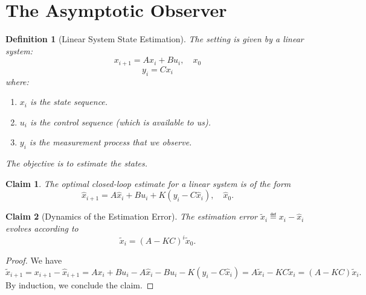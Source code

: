 \documentclass[a4 paper]{article}
\numberwithin{equation}{section}
\theoremstyle{boldStyle}
\theoremstyle{boldBlueStyle}
\newtheorem{claim}{Claim}[section]
\theoremstyle{boldPurpleStyle}
\theoremstyle{boldRedStyle}
\newtheorem{definition}{Definition}[section]
\theoremstyle{boldGreenStyle}
\begin{document}
\section{The Asymptotic Observer}

\begin{definition}[Linear System State Estimation]
  The setting is given by a linear system:
  \[
  x_{i+1} = A x_i + B u_i, \quad x_0
  \]
  \[
  y_i = C x_i
  \]
  where:
  \begin{enumerate}
      \item \( x_i \) is the state sequence.
      \item \( u_i \) is the control sequence (which is available to us).
      \item \( y_i \) is the measurement process that we observe.
  \end{enumerate}
  
  The objective is to estimate the states. 
\end{definition}

\begin{claim}
  The optimal closed-loop estimate for a linear system is of the form 
  \[
    \hat{x}_{i+1} = A \hat{x}_i + B u_i + K(y_i - C \hat{x}_i), \quad \hat{x}_0.
  \] 
\end{claim}

\begin{claim}[Dynamics of the Estimation Error]
  The estimation error \( \tilde{x}_{i} \eqdef x_{i} - \hat{x}_{i} \) evolves according to
  \[
  \tilde{x}_{i} = (A - KC)^{i} \tilde{x}_0.
  \]
\end{claim}

\begin{proof}
  We have
  \[
  \tilde{x}_{i+1} = x_{i+1} - \hat{x}_{i+1} = A x_i + B u_i - A \hat{x}_i - B u_i - K(y_i - C \hat{x}_i) = A \tilde{x}_i - K C \tilde{x}_i = (A - KC) \tilde{x}_i.
  \]
  By induction, we conclude the claim.
\end{proof}
\end{document}
